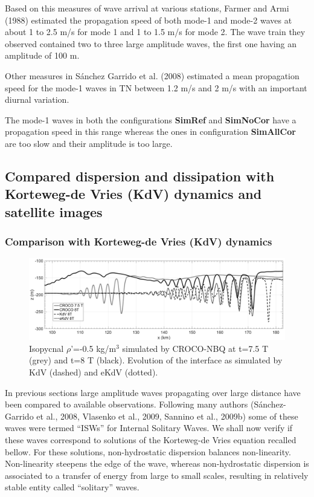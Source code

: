 \documentclass[a4paper,12pt]{article}
\begin{document}
Based on this measures of wave arrival at various stations, Farmer and Armi (1988) estimated the propagation speed of both mode-1 and mode-2 waves at about 1 to 2.5 m/s for mode 1 and 1 to 1.5 m/s for mode 2. The wave train they observed contained two to three large amplitude waves, the first one having an amplitude of 100 m. 

Other measures in S\'anchez Garrido et al. (2008) estimated a mean propagation speed for the mode-1 waves in TN between 1.2 m/s and 2 m/s with an important diurnal variation.

The mode-1 waves in both the configurations \textbf{SimRef} and \textbf{SimNoCor} have a propagation speed in this range whereas the ones in configuration \textbf{SimAllCor} are too slow and their amplitude is too large.


\subsection{Compared dispersion and dissipation with Korteweg-de Vries (KdV) dynamics and satellite images}

\subsubsection{Comparison with Korteweg-de Vries (KdV) dynamics}

\begin{figure}[!h]
\centering
\includegraphics[width=1\linewidth]{exp_kdv_75-8T.png}
\caption{Isopycnal $\rho$'=-0.5 kg/m$^3$ simulated by CROCO-NBQ at t=7.5 T (grey) and t=8 T (black). Evolution of the interface as simulated by KdV (dashed) and eKdV (dotted).}
\label{fig_kdv}
\end{figure}

In previous sections large amplitude waves propagating over large distance have been compared to available observations. Following many authors (S\'anchez-Garrido et al., 2008, Vlasenko et al., 2009, Sannino et al., 2009b) some of these waves were termed ``ISWs'' for Internal Solitary Waves. We shall now verify if these waves correspond to solutions of the Korteweg-de Vries equation recalled bellow. For these solutions, non-hydrostatic dispersion balances non-linearity. Non-linearity steepens the edge of the wave, whereas non-hydrostatic dispersion is associated to a transfer of energy from large to  small scales, resulting in relatively stable entity called ``solitary'' waves. 
\end{document}
